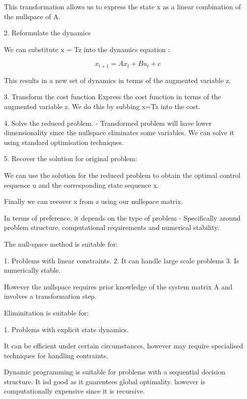 \documentclass{article}
\begin{document}
This transformation allows us to express the state x as a linear combination of the nullspace of A. 
\hspace{20 mm}

2. Reformulate the dynamics

We can substitute x = Tz into the dynamics equation :

\[ x_{t+1} = Ax_t + Bu_t + c \] 

This results in a new set of dynamics in terms of the augmented variable z.

\hspace{20 mm}

3. Transform the cost function
Express the cost function in terms of the augmented variable z. We do this by subbing x=Tz into the cost.
\hspace{20 mm}

4. Solve the reduced problem.
- Transformed problem will have lower dimensionality since the nullspace eliminates some variables. We can solve it using standard optimisation techniques.

\hspace{20 mm}

5. Recover the solution for original problem:

We can use the solution for the reduced problem to obtain the optimal control sequence u and the corresponding state sequence x.

Finally we can recover x from z using our nullspace matrix.
  
  In terms of preference, it depends on the type of problem - Specifically around problem structure, computational requirements and numerical stability.
  \hspace{20 mm}
  
  The null-space method is suitable for:
  
  1. Problems with linear constraints.
  \hspace{20 mm}
  2. It can handle large scale problems
  \hspace{20 mm}
  3. Is numerically stable.
  
 \hspace{20 mm}
 
 
 
 However the nullspace requires prior knowledge of the system matrix A and involves a transformation step. 
  
  
  \hspace{20 mm}
  
  Eliminitation is suitable for:
  
  1. Problems with explicit state dynamics.
  
  It can be efficient under certain circumstances, however may require specialised techniques for handling contraints.
  
  
  
  
  \hspace{20 mm}
  
 Dynamic programming is suitable for problems with a sequential decision structure. It isd good as it guarentees global optimality. however is computationally expensive since it is recursive.
 

 
\end{document}
